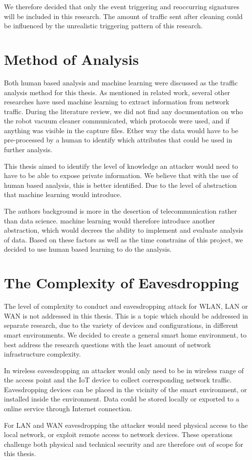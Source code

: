 We therefore decided that only the event triggering and reoccurring signatures will be included in this research. The amount of traffic sent after cleaning could be influenced by the unrealistic triggering pattern of this research. 

\section{Method of Analysis}
Both human based analysis and machine learning were discussed as the traffic analysis method for this thesis. As mentioned in related work, several other researches have used machine learning to extract information from network traffic. During the literature review, we did not find any documentation on who the robot vacuum cleaner communicated, which protocols were used, and if anything was visible in the capture files. Ether way the data would have to be pre-processed by a human to identify which attributes that could be used in further analysis.

This thesis aimed to identify the level of knowledge an attacker would need to have to be able to expose private information. We believe that with the use of human based analysis, this is better identified. Due to the level of abstraction that machine learning would introduce. 

The authors background is more in the desertion of telecommunication rather than data science. machine learning would therefore introduce another abstraction, which would decrees the ability to implement and evaluate analysis of data. Based on these factors as well as the time constrains of this project, we decided to use human based learning to do the analysis. 


\section{The Complexity of Eavesdropping}
The level of complexity to conduct and eavesdropping attack for WLAN, LAN or WAN is not addressed in this thesis. This is a topic which should be addressed in separate research, due to the variety of devices and configurations, in different smart environments. We decided to create a general smart home environment, to best address the research questions with the least amount of network infrastructure complexity. 

In wireless eavesdropping an attacker would only need to be in wireless range of the access point and the IoT device to collect corresponding network traffic. Eavesdropping devices can be placed in the vicinity of the smart environment, or installed inside the environment. Data could be stored locally or exported to a online service through Internet connection. 

For LAN and WAN eavesdropping the attacker would need physical access to the local network, or exploit remote access to network devices. These operations challenge both physical and technical security and are therefore out of scope for this thesis. 


